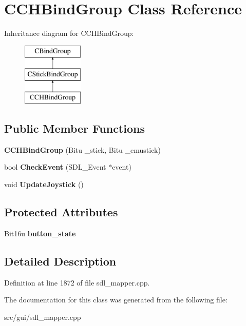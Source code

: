 \hypertarget{classCCHBindGroup}{\section{C\-C\-H\-Bind\-Group Class Reference}
\label{classCCHBindGroup}
}
Inheritance diagram for C\-C\-H\-Bind\-Group\-:\begin{figure}[H]
\begin{center}
\leavevmode
\includegraphics[height=3.000000cm]{classCCHBindGroup}
\end{center}
\end{figure}
\subsection*{Public Member Functions}
\begin{DoxyCompactItemize}
\item 
\hypertarget{classCCHBindGroup_a86bb3a7458f395324aae896cbe02f4dd}{{\bfseries C\-C\-H\-Bind\-Group} (Bitu \-\_\-stick, Bitu \-\_\-emustick)}\label{classCCHBindGroup_a86bb3a7458f395324aae896cbe02f4dd}

\item 
\hypertarget{classCCHBindGroup_a33b9f9ced9bf284c83219c33aa81bfe0}{bool {\bfseries Check\-Event} (S\-D\-L\-\_\-\-Event $\ast$event)}\label{classCCHBindGroup_a33b9f9ced9bf284c83219c33aa81bfe0}

\item 
\hypertarget{classCCHBindGroup_a11232134bcf2b6f8257f8103d34d2a13}{void {\bfseries Update\-Joystick} ()}\label{classCCHBindGroup_a11232134bcf2b6f8257f8103d34d2a13}

\end{DoxyCompactItemize}
\subsection*{Protected Attributes}
\begin{DoxyCompactItemize}
\item 
\hypertarget{classCCHBindGroup_a0d3a52894ed32833a5942a5b0e507c56}{Bit16u {\bfseries button\-\_\-state}}\label{classCCHBindGroup_a0d3a52894ed32833a5942a5b0e507c56}

\end{DoxyCompactItemize}


\subsection{Detailed Description}


Definition at line 1872 of file sdl\-\_\-mapper.\-cpp.



The documentation for this class was generated from the following file\-:\begin{DoxyCompactItemize}
\item 
src/gui/sdl\-\_\-mapper.\-cpp\end{DoxyCompactItemize}
